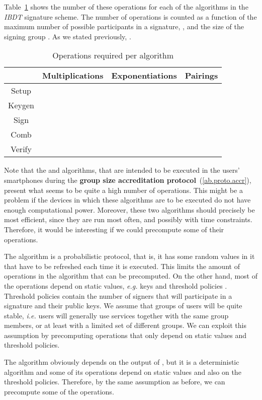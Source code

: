 \documentclass[11pt]{llncs}
\begin{document}
Table~\ref{ab.tab.ibdttimes} shows the number of
these operations for each of the algorithms
in the \emph{IBDT} signature scheme.
The number of operations is counted as a function of the
maximum number of possible participants in a signature, ,
and the size of the signing group .
As we stated previously, .

\begin{table}[!h]
\renewcommand{\arraystretch}{1.3}
\caption{Operations required per algorithm} \label{ab.tab.ibdttimes}
\centering
\begin{tabular}{c||c||c||c}
\hline
& \bfseries Multiplications & \bfseries Exponentiations & \bfseries Pairings \\
\hline
\hline
Setup &  &  & \\
Keygen &  &  &  \\
Sign	& 	 &  & \\
Comb &  &  & \\
Verify &  &  &  \\
\hline
\end{tabular}
\end{table}

Note that the  and  algorithms, that are intended to be
executed in the users' smartphones during the
\textbf{group size accreditation protocol}~(\ref{ab.proto.accr}),
present what seems to be quite a high number of operations.
This might be a problem if the devices in which these algorithms
are to be executed do not have enough computational power.
Moreover, these two algorithms should precisely be
most efficient, since they are run most often, and possibly
with time constraints.
Therefore, it would be interesting if we could precompute
some of their operations.

The  algorithm is a probabilistic protocol, that is,
it has some random values in it that have to be
refreshed each time it is executed. This limits the amount
of operations in the algorithm that can be precomputed.
On the other hand, most of the operations depend on
static values, \emph{e.g.} keys and threshold policies .
Threshold policies contain the number of signers that will
participate in a signature and their public keys.
We assume that groups of users will be quite stable,
\emph{i.e.} users will generally use services
together with the same
group members, or at least with a limited set of different groups.
We can exploit this assumption by precomputing operations
that only depend on static values and threshold policies.

The  algorithm obviously depends on the output
of , but it is a deterministic algorithm and some of
its operations depend on static values and also on the
threshold policies. Therefore, by the same assumption
as before, we can precompute some of the operations.
\end{document}
